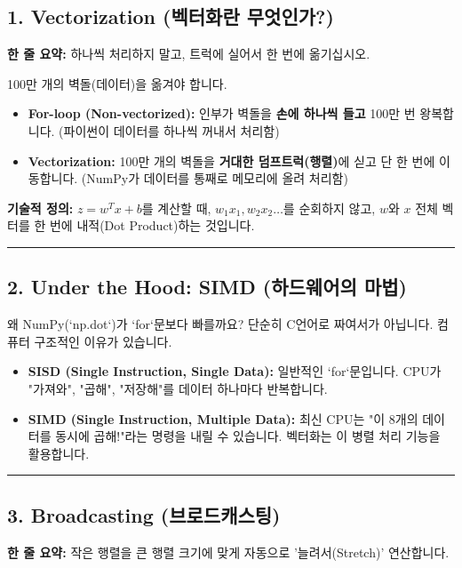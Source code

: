 \documentclass[11pt,a4paper]{book}
\theoremstyle{definition}
\begin{document}
\subsection{1. Vectorization (벡터화란 무엇인가?)}
\textbf{한 줄 요약:} 하나씩 처리하지 말고, 트럭에 실어서 한 번에 옮기십시오.

\begin{analogybox}[title={이사짐 옮기기 비유}]
100만 개의 벽돌(데이터)을 옮겨야 합니다.
\begin{itemize}
    \item \textbf{For-loop (Non-vectorized):} 인부가 벽돌을 \textbf{손에 하나씩 들고} 100만 번 왕복합니다. (파이썬이 데이터를 하나씩 꺼내서 처리함)
    \item \textbf{Vectorization:} 100만 개의 벽돌을 \textbf{거대한 덤프트럭(행렬)}에 싣고 단 한 번에 이동합니다. (NumPy가 데이터를 통째로 메모리에 올려 처리함)
\end{itemize}
\end{analogybox}

\textbf{기술적 정의:}
$z = w^T x + b$를 계산할 때, $w_1x_1, w_2x_2 \dots$를 순회하지 않고, $w$와 $x$ 전체 벡터를 한 번에 내적(Dot Product)하는 것입니다.

\vspace{0.5cm}\hrule\vspace{0.5cm}

\subsection{2. Under the Hood: SIMD (하드웨어의 마법)}
왜 NumPy(`np.dot`)가 `for`문보다 빠를까요? 단순히 C언어로 짜여서가 아닙니다. 컴퓨터 구조적인 이유가 있습니다.


\begin{itemize}
    \item \textbf{SISD (Single Instruction, Single Data):} 일반적인 `for`문입니다. CPU가 "가져와", "곱해", "저장해"를 데이터 하나마다 반복합니다.
    \item \textbf{SIMD (Single Instruction, Multiple Data):} 최신 CPU는 "이 8개의 데이터를 동시에 곱해!"라는 명령을 내릴 수 있습니다. 벡터화는 이 병렬 처리 기능을 활용합니다.
\end{itemize}

\vspace{0.5cm}\hrule\vspace{0.5cm}

\subsection{3. Broadcasting (브로드캐스팅)}
\textbf{한 줄 요약:} 작은 행렬을 큰 행렬 크기에 맞게 자동으로 '늘려서(Stretch)' 연산합니다.
\end{document}
